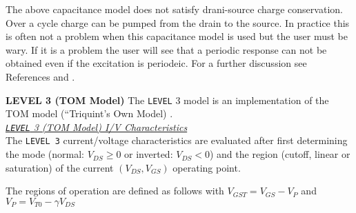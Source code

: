 The above capacitance model does not satisfy drani-source charge
conservation.  Over a cycle charge can be pumped from the drain to the
source.   In practice this is often not a problem when this capacitance
model is used but the user must be wary.
If it is a problem the user will see that a periodic response can not be
obtained even if the excitation is periodeic.  For a further discussion see
References \cite{divekar:87} and \cite{smith:87}.

{\noindent\bf LEVEL 3 (TOM Model)}\myline
The {\tt LEVEL} 3 model is an implementation of the TOM model (``Triquint's
Own Model) \cite{mccamant:mccormack:90}.\\

\noindent\underline{\sl {\tt LEVEL} 3 (TOM Model)
I/V Characteristics}\\[0.1in]
The {\tt LEVEL 3} current/voltage characteristics are evaluated after first
determining the mode (normal: $V_{DS} \ge 0$ or inverted:
$V_{DS} < 0$) and the region (cutoff,
linear or saturation) of the current
$(V_{DS}, V_{GS})$ operating point.

\noindent


\medskip

\noindent
The regions of operation are defined as follows
with \hfill $V_{GST} = V_{GS}-V_P$ \inlineeq
and\hfill$V_P = V_{T0} - \gamma V_{DS}$\inlineeq

\medskip

